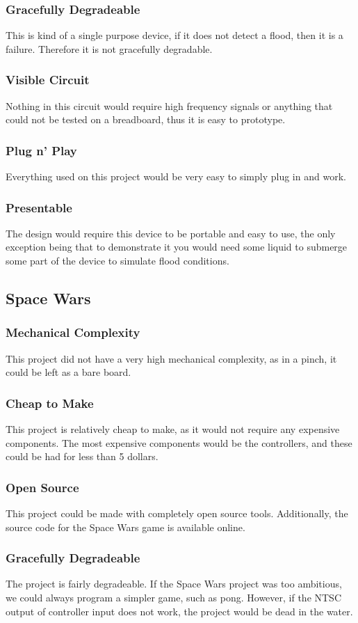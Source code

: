 \documentclass{article}
\begin{document}
\subsubsection{Gracefully Degradeable}
This is kind of a single purpose device, if it does not detect a flood, then
it is a failure. Therefore it is not gracefully degradable.
\subsubsection{Visible Circuit}
Nothing in this circuit would require high frequency signals or anything that 
could not be tested on a breadboard, thus it is easy to prototype.
\subsubsection{Plug n' Play}
Everything used on this project would be very easy to simply plug in and work.
\subsubsection{Presentable}
The design would require this device to be portable and easy to use, the only
exception being that to demonstrate it you would need some liquid to submerge 
some part of the device to simulate flood conditions.


\subsection{Space Wars}
\subsubsection {Mechanical Complexity}
This project did not have a very high mechanical complexity, as in a
pinch, it could be left as a bare board. 
\subsubsection{Cheap to Make}
This project is relatively cheap to make, as it would not require any
expensive components. The most expensive components would be the
controllers, and these could be had for less than 5 dollars. 
\subsubsection{Open Source}
This project could be made with completely open source
tools. Additionally, the source code for the Space Wars game is
available online.
\subsubsection{Gracefully Degradeable}
The project is fairly degradeable. If the Space Wars project was too
ambitious, we could always program a simpler game, such as
pong. However, if the NTSC output of controller input does not work,
the project would be dead in the water.
\end{document}
